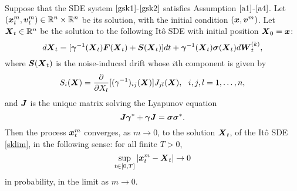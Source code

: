 \begin{theorem} \label{skthm} Suppose that the SDE system $\eqref{gsk1}$-$\eqref{gsk2}$ satisfies Assumption $\ref{a1}$-$\ref{a4}$. Let $(\boldsymbol{x}^m_{t}, \boldsymbol{v}^m_{t}) \in \mathbb{R}^{n} \times \mathbb{R}^{n}$ be its solution, with the initial condition $(\boldsymbol{x}, \boldsymbol{v}^m)$. Let $\boldsymbol{X}_{t} \in \mathbb{R}^{n}$ be the solution to the following It\^o SDE with initial position $\boldsymbol{X}_{0} = \boldsymbol{x}$: 
\begin{equation} \label{sklim}
d\boldsymbol{X}_{t} = [\boldsymbol{\gamma}^{-1}(\boldsymbol{X}_{t}) \boldsymbol{F}(\boldsymbol{X}_{t}) + \boldsymbol{S}(\boldsymbol{X}_{t})] dt + \boldsymbol{\gamma}^{-1}(\boldsymbol{X}_{t}) \boldsymbol{\sigma}(\boldsymbol{X}_{t}) d \boldsymbol{W}^{(k)}_{t}, 
\end{equation}
where $\boldsymbol{S}(\boldsymbol{X}_{t})$ is the noise-induced drift whose $i$th component is given by 
\begin{equation}
S_{i}(\boldsymbol{X}) = \frac{\partial}{\partial X_{l}}[(\gamma^{-1})_{ij}(\boldsymbol{X})] J_{jl}(\boldsymbol{X}), \ \ i,j,l = 1, \dots, n, \end{equation}
and $\boldsymbol{J}$ is the unique matrix solving the Lyapunov equation 
\begin{equation} \label{lyp}
\boldsymbol{J} \boldsymbol{\gamma}^{*} + \boldsymbol{\gamma} \boldsymbol{J} = \boldsymbol{\sigma} \boldsymbol{\sigma}^{*}. 
\end{equation}
Then the process $\boldsymbol{x}^m_{t}$ converges, as $m \to 0$, to the solution $\boldsymbol{X}_{t}$, of the It\^o SDE \eqref{sklim}, in the following sense:  for all finite $T>0$, 
\begin{equation}
\sup_{t \in [0,T]} |\boldsymbol{x}_t^m - \boldsymbol{X}_t| \to 0
\end{equation} in probability, in the limit as $m \to 0$.  

\end{theorem}



